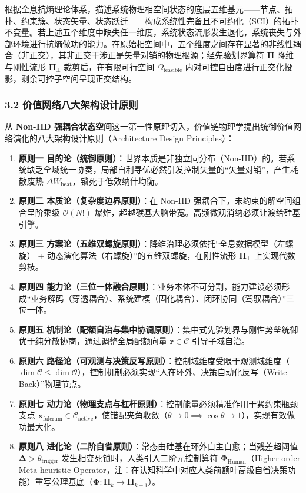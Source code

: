 \documentclass[
]{article}
\providecommand{\tightlist}{%
  \setlength{\itemsep}{0pt}\setlength{\parskip}{0pt}}
\begin{document}
根据全息抗熵理论体系，描述系统物理相空间状态的底层五维基元------节点、拓扑、约束簇、状态矢量、状态跃迁------构成系统性完备且不可约化（SCI）的拓扑不变量。若上述五个维度中缺失任一维度，系统状态流形发生退化，系统丧失与外部环境进行抗熵做功的能力。在原始相空间中，五个维度之间存在显著的非线性耦合（非正交），其非正交干涉正是矢量对销的物理根源；经先验划界算符
\(\mathbf{\Pi}\) 降维与刚性流形 \(\mathbf{\Pi}_\bot\)
裁剪后，在有限可行空间 \(\Omega_{\mathrm{feasible}}\)
内对可控自由度进行正交化投影，剩余可控子空间呈现正交结构。

\subsubsection{3.2
价值网络八大架构设计原则}\label{ux4ef7ux503cux7f51ux7edcux516bux5927ux67b6ux6784ux8bbeux8ba1ux539fux5219}

从 \textbf{Non-IID
强耦合状态空间}这一第一性原理切入，价值链物理学提出统御价值网络演化的八大架构设计原则（Architecture
Design Principles）：

\begin{enumerate}
\def\labelenumi{\arabic{enumi}.}
\tightlist
\item
  \textbf{原则一
  目的论（统御原则）}：世界本质是非独立同分布（Non-IID）的。若系统缺乏全域统一协奏，局部自利寻优必然引发控制矢量的``矢量对销''，产生耗散废热
  \(\Delta W_{\text{heat}}\)，锁死于低效纳什均衡。
\item
  \textbf{原则二 本质论（复杂度边界原则）}：在 Non-IID
  强耦合下，未约束的解空间组合呈阶乘级 \(\mathcal{O}(N!)\)
  爆炸，超越碳基大脑带宽。高频微观消纳必须让渡给硅基引擎。
\item
  \textbf{原则三
  方案论（五维双螺旋原则）}：降维治理必须依托``全息数据模型（左螺旋） +
  动态演化算法（右螺旋）''的五维双螺旋，在刚性流形 \(\mathbf{\Pi}_\bot\)
  上实现代数剪枝。
\item
  \textbf{原则四
  能力论（三位一体融合原则）}：业务本体不可分割，能力建设必须形成``业务解码（穿透耦合）、系统建模（固化耦合）、闭环协同（驾驭耦合）''三位一体。
\item
  \textbf{原则五
  机制论（配额自治与集中协调原则）}：集中式先验划界与刚性势垒统御优于纯分散协商，通过调整全局配额向量
  \(\mathbf{r} \in \mathcal{C}\) 引导子域自治。
\item
  \textbf{原则六
  路径论（可观测与决策反写原则）}：控制域维度受限于观测域维度（\(\dim \mathcal{C} \le \dim \mathcal{O}\)），控制机制必须实现``人在环外、决策自动化反写（Write-Back）''物理节点。
\item
  \textbf{原则七
  动力论（物理支点与杠杆原则）}：控制能量必须精准作用于紧约束瓶颈支点
  \(\mathbf{x}_{\text{fulcrum}} \in \mathcal{C}_{\text{active}}\)，使错配夹角收敛（\(\theta \to 0 \implies \cos\theta \to 1\)），实现有效做功最大化。
\item
  \textbf{原则八
  进化论（二阶自省原则）}：常态由硅基在环外自主自愈；当残差超阈值
  \(\mathbf{\Delta} > \theta_{\mathrm{trigger}}\)
  发生相变死锁时，人类引入二阶元控制算符
  \(\mathbf{\Phi}_{\mathrm{Human}}\)（Higher-order Meta-heuristic
  Operator，注：在认知科学中对应人类前额叶高级自省决策功能）重写公理基底（\(\mathbf{\Phi}: \mathbf{\Pi}_k \to \mathbf{\Pi}_{k+1}\)）。
\end{enumerate}
\end{document}
